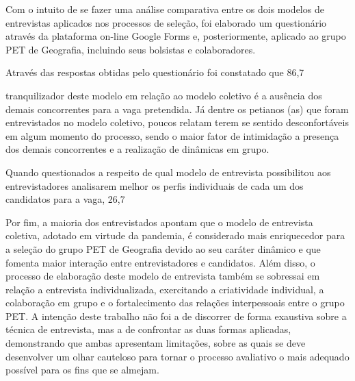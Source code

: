 Com o intuito de se fazer uma análise comparativa entre os dois modelos de entrevistas aplicados nos processos de seleção, foi elaborado um questionário através da plataforma on-line Google Forms e, posteriormente, aplicado ao grupo PET de Geografia, incluindo seus bolsistas e colaboradores.

Através das respostas obtidas pelo questionário foi constatado que 86,7%

tranquilizador deste modelo em relação ao modelo coletivo é a ausência dos demais concorrentes para a vaga pretendida. Já dentre os petianos (as) que foram entrevistados no modelo coletivo, poucos relatam terem se sentido desconfortáveis em algum momento do processo, sendo o maior fator de intimidação a presença dos demais concorrentes e a realização de dinâmicas em grupo.

Quando questionados a respeito de qual modelo de entrevista possibilitou aos entrevistadores analisarem melhor os perfis individuais de cada um dos candidatos para a vaga, 26,7%

Por fim, a maioria dos entrevistados apontam que o modelo de entrevista coletiva, adotado em virtude da pandemia, é considerado mais enriquecedor para a seleção do grupo PET de Geografia devido ao seu caráter dinâmico e que fomenta maior interação entre entrevistadores e candidatos. Além disso, o processo de elaboração deste modelo de entrevista também se sobressai em relação a entrevista individualizada, exercitando a criatividade individual, a colaboração em grupo e o fortalecimento das relações interpessoais entre o grupo PET. A intenção deste trabalho não foi a de discorrer de forma exaustiva sobre a técnica de entrevista, mas a de confrontar as duas formas aplicadas, demonstrando que ambas apresentam limitações, sobre as quais se deve desenvolver um olhar cauteloso para tornar o processo avaliativo o mais adequado possível para os fins que se almejam.

